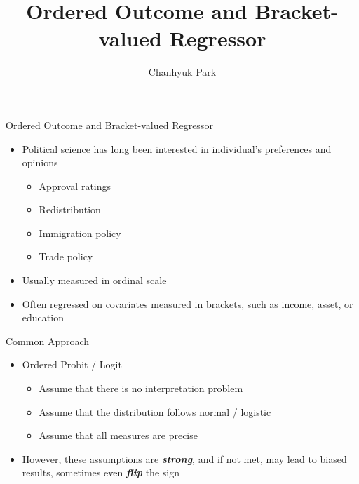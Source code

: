 \documentclass[xcolor=dvipsnames]{beamer}
\title{Ordered Outcome and Bracket-valued Regressor}
\author{Chanhyuk Park}
\institute{Washington University in St. Louis}
\date{}
\begin{document}
   \frame{\titlepage}

\begin{frame}{Ordered Outcome and Bracket-valued Regressor}
    \begin{itemize}[<+->]
        \item Political science has long been interested in individual's preferences and opinions
            \begin{itemize}
                \item Approval ratings {\tiny\citep{Canes-Wrone2002a, Kriner2009a}}
                \item Redistribution {\tiny\citep{Alt2017a, Magni2021a}}
                \item Immigration policy {\tiny\citep{Hainmueller2007a}}
                \item Trade policy {\tiny\citep{Scheve2001r, Mayda2005a, Wu2022a}}
            \end{itemize}
        \item Usually measured in ordinal scale \\
        \item Often regressed on covariates measured in brackets, such as income, asset, or education \\
    \end{itemize}
\end{frame}

\begin{frame}{Common Approach}
    \begin{itemize}[<+->]
        \item Ordered Probit / Logit
            \begin{itemize}
                \item Assume that there is no interpretation problem
                \item Assume that the distribution follows normal / logistic
                \item Assume that all measures are precise
            \end{itemize}
        \item However, these assumptions are \textbf{\textit{strong}}, and if not met, may lead to biased results, sometimes even \textbf{\textit{flip}} the sign {\tiny\citep{Manski1988a, Greene2010a, Bond2018a}}
    \end{itemize}
\end{frame}
\end{document}
